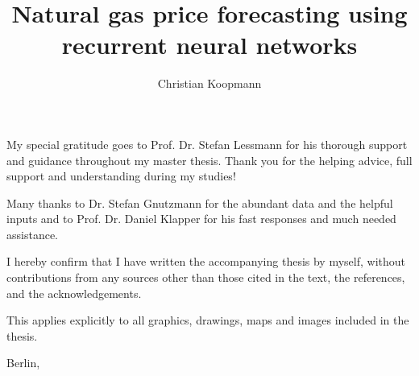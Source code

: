 \documentclass[12pt]{ociamthesis}
\title{\Large{Natural gas price forecasting using recurrent neural networks}}     %
\author{Christian Koopmann}             %
\begin{document}
\maketitle
\begin{romanpages}
\begin{acknowledgements}
My special gratitude goes to Prof. Dr. Stefan Lessmann for his thorough support and guidance throughout my master thesis. Thank you for the helping advice, full support and understanding during my studies! 

Many thanks to Dr. Stefan Gnutzmann for the abundant data and the helpful inputs and to Prof. Dr. Daniel Klapper for his fast responses and much needed assistance.
\end{acknowledgements}
\tableofcontents
\listoffigures
\listoftables

\end{romanpages}






\begin{originality}
I hereby confirm that I have written the accompanying thesis by myself, without
contributions from any sources other than those cited in the text, the references, and
the acknowledgements.

This applies explicitly to all graphics, drawings, maps and images included in the
thesis.

Berlin, 
\end{originality}
\end{document}

